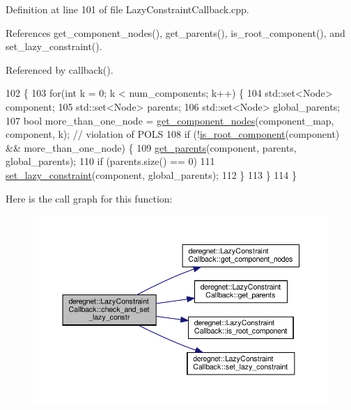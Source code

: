 Definition at line 101 of file Lazy\+Constraint\+Callback.\+cpp.



References get\+\_\+component\+\_\+nodes(), get\+\_\+parents(), is\+\_\+root\+\_\+component(), and set\+\_\+lazy\+\_\+constraint().



Referenced by callback().


\begin{DoxyCode}
102                                                                                                          \{
103     \textcolor{keywordflow}{for}(\textcolor{keywordtype}{int} k = 0; k < num\_components; k++) \{
104         std::set<Node> component;
105         std::set<Node> parents;
106         std::set<Node> global\_parents;
107         \textcolor{keywordtype}{bool} more\_than\_one\_node = \hyperlink{classderegnet_1_1LazyConstraintCallback_a9ebed5d496c64603628b8655dd538839}{get\_component\_nodes}(component\_map, component, k);  \textcolor{comment}{//
       violation of POLS}
108         \textcolor{keywordflow}{if} (!\hyperlink{classderegnet_1_1LazyConstraintCallback_a3eb6c682c8e1129036f1218513d6feb0}{is\_root\_component}(component) && more\_than\_one\_node) \{
109             \hyperlink{classderegnet_1_1LazyConstraintCallback_ab1357c9415e190aaa56ed87022ec0b82}{get\_parents}(component, parents, global\_parents);
110             \textcolor{keywordflow}{if} (parents.size() == 0)
111                 \hyperlink{classderegnet_1_1LazyConstraintCallback_a8f6db7da84271afcd2e2169318569558}{set\_lazy\_constraint}(component, global\_parents);
112         \}
113     \}
114 \}
\end{DoxyCode}
Here is the call graph for this function\+:\nopagebreak
\begin{figure}[H]
\begin{center}
\leavevmode
\includegraphics[width=350pt]{classderegnet_1_1LazyConstraintCallback_a02eb39d4ea843597aa7c3382f17af874_cgraph}
\end{center}
\end{figure}
